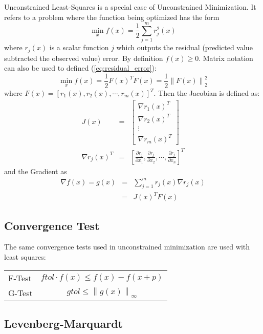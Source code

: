 \documentclass[peerreview,compsoc,onecolumn]{IEEEtran}
\newcommand{\norm}[1]{\left\lVert#1\right\rVert}
\begin{document}
Unconstrained Least-Squares is a special case of Unconstrained Minimization. It refers to a problem where the function being optimized has the form
\begin{equation}
\label{eq:residual_error}
\min\limits_{x} f(x)=\frac{1}{2}\sum^m_{j=1} r^2_j(x)
\end{equation}
where $r_j(x)$ is a scalar function $j$  which outputs the residual (predicted value subtracted the observed value) error. By definition $f(x) \ge 0$. Matrix notation can also be used to defined (\ref{eq:residual_error}):
\begin{equation}
\min\limits_{x} f(x) =\frac{1}{2} F(x)^T F(x) = \frac{1}{2} \norm{F(x)}^2_2
\end{equation}
where $F(x) = [ r_1(x) , r_2(x) , \cdots , r_m(x) ]^T$. Then the Jacobian is defined as:
\begin{eqnarray}
J(x) &=&  \left[ \begin{array}{c}\nabla r_1(x)^T \\ \nabla r_2(x)^T \\ \vdots \\ \nabla r_m(x)^T \end{array}\right] \\
\nabla r_j(x)^T &=& \left[ \frac{\partial r_j}{\partial x_1},\frac{\partial r_j}{\partial x_2}, \cdots , \frac{\partial r_j}{\partial x_n} \right]^T
\end{eqnarray}
and the Gradient as
\begin{eqnarray}
\nabla f(x) = g(x) &=& \sum^m_{j=1}r_j(x)\nabla r_j(x) \\
&=& J(x)^T F(x)
\end{eqnarray}

\subsection{Convergence Test}

The same convergence tests used in unconstrained minimization are used with least squares:
\begin{center}
\begin{tabular}{lc}
F-Test & $ftol \cdot f(x)  \leq f(x) - f(x+p)$ \\
G-Test & $gtol \leq \norm{g(x)}_\infty$ \\
\end{tabular}
\end{center}

\subsection{Levenberg-Marquardt}
\end{document}
